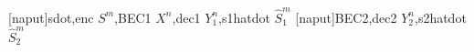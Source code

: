 \begin{pspicture}[showgrid=false]
	[naput]{sdot,enc $S^{m}$,BEC1 $X^{n}$,dec1 $Y_{1}^{n}$,s1hatdot $\hat{S}_{1}^{m}$}
	[naput]{BEC2,dec2 $Y_{2}^{n}$,s2hatdot $\hat{S}_{2}^{m}$}
	
\end{pspicture}